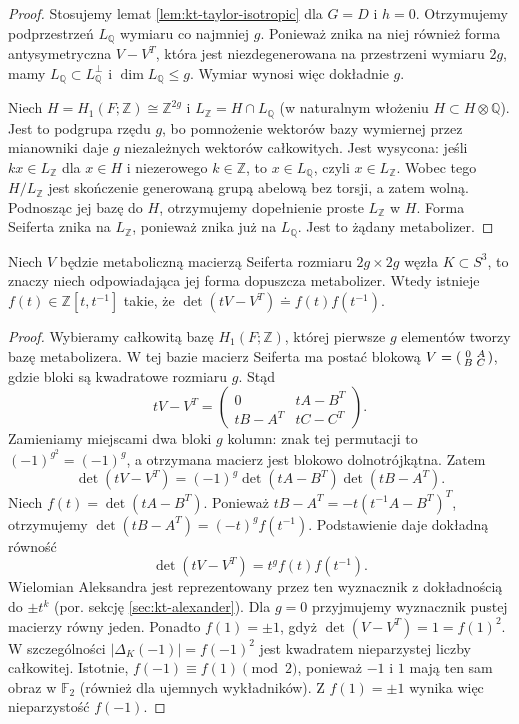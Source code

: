 \begin{proof}
Stosujemy lemat \ref{lem:kt-taylor-isotropic}
dla $G=D$ i $h=0$. Otrzymujemy podprzestrzeń
$L_{\mathbb Q}$ wymiaru co najmniej $g$.
Ponieważ znika na niej również forma
antysymetryczna $V-V^T$, która jest
niezdegenerowana na przestrzeni wymiaru $2g$,
mamy $L_{\mathbb Q}\subset L_{\mathbb Q}^{\perp}$
i $\dim L_{\mathbb Q}\le g$. Wymiar wynosi
więc dokładnie $g$.

Niech $H=H_1(F;\mathbb Z)\cong\mathbb Z^{2g}$
i $L_{\mathbb Z}=H\cap L_{\mathbb Q}$
(w naturalnym włożeniu $H\subset H\otimes\mathbb Q$).
Jest to podgrupa rzędu $g$, bo pomnożenie
wektorów bazy wymiernej przez mianowniki
daje $g$ niezależnych wektorów całkowitych.
Jest wysycona: jeśli $kx\in L_{\mathbb Z}$
dla $x\in H$ i niezerowego $k\in\mathbb Z$,
to $x\in L_{\mathbb Q}$, czyli $x\in L_{\mathbb Z}$.
Wobec tego $H/L_{\mathbb Z}$ jest skończenie
generowaną grupą abelową bez torsji, a zatem
wolną. Podnosząc jej bazę do $H$, otrzymujemy
dopełnienie proste $L_{\mathbb Z}$ w $H$.
Forma Seiferta znika na $L_{\mathbb Z}$,
ponieważ znika już na $L_{\mathbb Q}$.
Jest to żądany metabolizer.
\end{proof}

\begin{stwierdzenie}
\label{st:kt-fox-milnor-factorization}
Niech $V$ będzie metaboliczną macierzą Seiferta
rozmiaru $2g\times 2g$ węzła $K\subset S^3$,
to znaczy niech odpowiadająca jej forma
dopuszcza metabolizer.
Wtedy istnieje $f(t)\in\mathbb Z[t,t^{-1}]$ takie, że
$\det(tV-V^T)\doteq f(t)f(t^{-1})$.
\end{stwierdzenie}

\begin{proof}
Wybieramy całkowitą bazę $H_1(F;\mathbb Z)$,
której pierwsze $g$ elementów tworzy bazę metabolizera.
W tej bazie macierz Seiferta ma postać blokową
$V=\begin{psmallmatrix}0&A\\B&C\end{psmallmatrix}$,
gdzie bloki są kwadratowe rozmiaru $g$.
Stąd
\[
tV-V^T=\begin{pmatrix}
0&tA-B^T\\tB-A^T&tC-C^T
\end{pmatrix}.
\]
Zamieniamy miejscami dwa bloki $g$ kolumn:
znak tej permutacji to $(-1)^{g^2}=(-1)^g$,
a otrzymana macierz jest blokowo dolnotrójkątna.
Zatem
\[
\det(tV-V^T)=(-1)^g\det(tA-B^T)\det(tB-A^T).
\]
Niech $f(t)=\det(tA-B^T)$. Ponieważ
$tB-A^T=-t(t^{-1}A-B^T)^T$, otrzymujemy
$\det(tB-A^T)=(-t)^g f(t^{-1})$.
Podstawienie daje dokładną równość
\[
\det(tV-V^T)=t^g f(t)f(t^{-1}).
\]
Wielomian Aleksandra jest reprezentowany przez
ten wyznacznik z dokładnością do $\pm t^k$
(por. sekcję \ref{sec:kt-alexander}).
Dla $g=0$ przyjmujemy wyznacznik pustej macierzy
równy jeden. Ponadto $f(1)=\pm1$, gdyż
$\det(V-V^T)=1=f(1)^2$. W szczególności
$|\Delta_K(-1)|=f(-1)^2$ jest kwadratem
nieparzystej liczby całkowitej. Istotnie,
$f(-1)\equiv f(1)\pmod 2$, ponieważ $-1$ i $1$
mają ten sam obraz w $\mathbb F_2$ (również
dla ujemnych wykładników). Z $f(1)=\pm1$
wynika więc nieparzystość $f(-1)$.
\end{proof}


